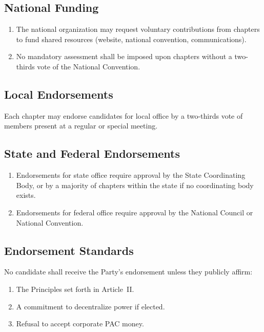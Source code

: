 \documentclass[11pt, letterpaper]{article}
\begin{document}
\subsection{National Funding}
\begin{enumerate}
  \item The national organization may request voluntary contributions from chapters to fund shared resources (website, national convention, communications).
  \item No mandatory assessment shall be imposed upon chapters without a two-thirds vote of the National Convention.
\end{enumerate}



\subsection{Local Endorsements}
Each chapter may endorse candidates for local office by a two-thirds vote of members present at a regular or special meeting.

\subsection{State and Federal Endorsements}
\begin{enumerate}
  \item Endorsements for state office require approval by the State Coordinating Body, or by a majority of chapters within the state if no coordinating body exists.
  \item Endorsements for federal office require approval by the National Council or National Convention.
\end{enumerate}

\subsection{Endorsement Standards}
No candidate shall receive the Party's endorsement unless they publicly affirm:
\begin{enumerate}
  \item The Principles set forth in Article~II.
  \item A commitment to decentralize power if elected.
  \item Refusal to accept corporate PAC money.
\end{enumerate}
\end{document}
